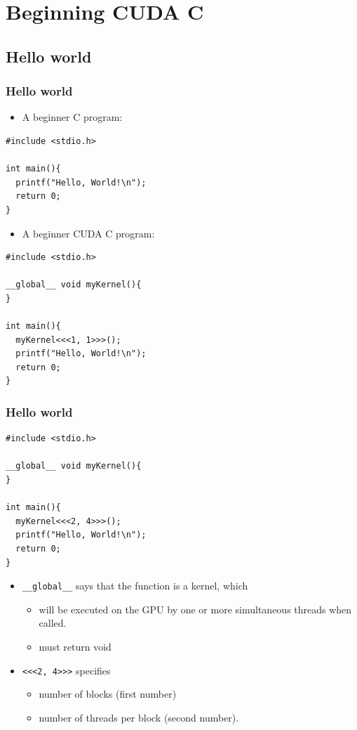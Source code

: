 \documentclass[handout]{beamer}
\numberwithin{equation}{section}
\begin{document}
\section{Beginning CUDA C}

\subsection{Hello world}

\begin{frame}[fragile]
\frametitle{Hello world}

\small

\begin{itemize}
\item A beginner C program:
\end{itemize}

\lstset{basicstyle=\scriptsize}

\begin{lstlisting}
#include <stdio.h> 

int main(){
  printf("Hello, World!\n");
  return 0;
}
\end{lstlisting}

\begin{itemize}
\pause \item A beginner CUDA C program:
\end{itemize}

 \begin{lstlisting}
#include <stdio.h> 

__global__ void myKernel(){
} 

int main(){
  myKernel<<<1, 1>>>();
  printf("Hello, World!\n");
  return 0;
}
\end{lstlisting}
\end{frame}


\begin{frame}[fragile]
\frametitle{Hello world}

\begin{lstlisting}
#include <stdio.h> 

__global__ void myKernel(){
} 

int main(){
  myKernel<<<2, 4>>>();
  printf("Hello, World!\n");
  return 0;
}
\end{lstlisting}

\begin{itemize}
\pause \item {\tt \_\_global\_\_} says that the function is a kernel, which
\begin{itemize}
\pause \item will be executed on the GPU by one or more simultaneous threads when called.
\pause \item must return void
\end{itemize}
\pause \item {\tt <<<2, 4>>>} specifies
\begin{itemize}
\pause \item number of blocks (first number)
\pause \item number of threads per block (second number).
\end{itemize}
\end{itemize}
\end{frame}
\end{document}

